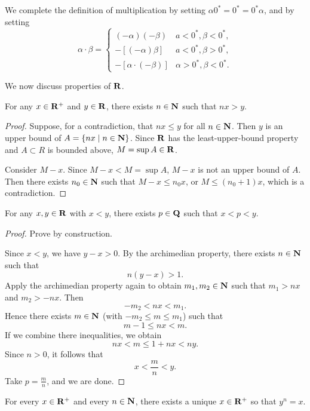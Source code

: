 We complete the definition of multiplication by setting $\alpha0^*=0^*=0^*\alpha$, and by setting
\[\alpha\cdot\beta=\begin{cases}
(-\alpha)(-\beta)&a<0^*,\beta<0^*,\\
-[(-\alpha)\beta]&a<0^*,\beta>0^*,\\
-[\alpha\cdot(-\beta)]&\alpha>0^*,\beta<0^*.
\end{cases}\]
\pagebreak

We now discuss properties of $\RR$.

\begin{theorem}[$\RR$ is archimedian]\label{thrm:r-archimedian}
For any $x\in\mathbf R^+$ and $y\in\mathbf R$, there exists $n\in\mathbf N$ such that $nx>y$.
\end{theorem}

\begin{proof}
Suppose, for a contradiction, that $nx\le y$ for all $n\in\mathbf N$. Then $y$ is an upper bound of $A=\{nx\mid n\in\mathbf N\}$. Since $\RR$ has the least-upper-bound property and $A\subset R$ is bounded above, $M=\sup A\in\mathbf R$.

Consider $M-x$. Since $M-x<M=\sup A$, $M-x$ is not an upper bound of $A$. Then there exists $n_0\in\mathbf N$ such that $M-x\le n_0x$, or $M\le(n_0+1)x$, which is a contradiction.
\end{proof}

\begin{theorem}[$\QQ$ is dense in $\RR$]
For any $x,y\in\mathbf R$ with $x<y$, there exists $p\in\mathbf Q$ such that $x<p<y$.
\end{theorem}

\begin{proof}
Prove by construction.

Since $x<y$, we have $y-x>0$. By the archimedian property, there exists $n\in\mathbf N$ such that
\[n(y-x)>1.\]
Apply the archimedian property again to obtain $m_1,m_2\in\mathbf N$ such that $m_1>nx$ and $m_2>-nx$. Then
\[-m_2<nx<m_1.\]
Hence there exists $m\in\mathbf N$ (with $-m_2\le m\le m_1$) such that
\[m-1\le nx<m.\]
If we combine there inequalities, we obtain
\[nx<m\le1+nx<ny.\]
Since $n>0$, it follows that
\[x<\frac{m}{n}<y.\]
Take $p=\frac{m}{n}$, and we are done.
\end{proof}

\begin{theorem}
For every $x\in\mathbf R^+$ and every $n\in\mathbf N$, there exists a unique $x\in\mathbf R^+$ so that $y^n=x$.
\end{theorem}

